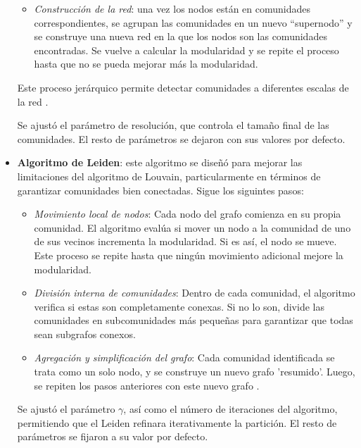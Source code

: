 \begin{itemize}
\begin{itemize}
        \item \textit{Construcción de la red}: una vez los nodos están en comunidades correspondientes, se agrupan las comunidades en un nuevo “supernodo” y se construye una nueva red en la que los nodos son las comunidades encontradas. Se vuelve a calcular la modularidad y se repite el proceso hasta que no se pueda mejorar más la modularidad.
    \end{itemize}

    Este proceso jerárquico permite detectar comunidades a diferentes escalas de la red \cite{Blondel2008Louvain}.

    Se ajustó el parámetro de resolución, que controla el tamaño final de las comunidades. El resto de parámetros se dejaron con sus valores por defecto.
    
    \item \textbf{Algoritmo de Leiden}: este algoritmo se diseñó para mejorar las limitaciones del algoritmo de Louvain, particularmente en términos de garantizar comunidades bien conectadas. Sigue los siguintes pasos:

    \begin{itemize}
        \item \textit{Movimiento local de nodos}: Cada nodo del grafo comienza en su propia comunidad. El algoritmo evalúa si mover un nodo a la comunidad de uno de sus vecinos incrementa la modularidad. Si es así, el nodo se mueve. Este proceso se repite hasta que ningún movimiento adicional mejore la modularidad.

        \item \textit{División interna de comunidades}: Dentro de cada comunidad, el algoritmo verifica si estas son completamente conexas. Si no lo son, divide las comunidades en subcomunidades más pequeñas para garantizar que todas sean subgrafos conexos.

        \item \textit{Agregación y simplificación del grafo}: Cada comunidad identificada se trata como un solo nodo, y se construye un nuevo grafo 'resumido'. Luego, se repiten los pasos anteriores con este nuevo grafo \cite{traag2019leiden}.
    \end{itemize}
    
    Se ajustó el parámetro \(\gamma\), así como el número de iteraciones del algoritmo, permitiendo que el Leiden refinara iterativamente la partición. El resto de parámetros se fijaron a su valor por defecto. 

\end{itemize}
